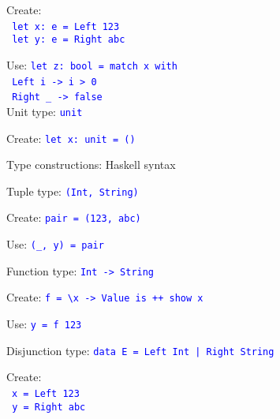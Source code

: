 Create:\\
 \texttt{\textcolor{blue}{\footnotesize{}\ let x:\ e = Left 123}}~\\
\texttt{\textcolor{blue}{\footnotesize{} let y:\ e = Right \textquotedbl abc\textquotedbl}}{\footnotesize\par}

Use: \texttt{\textcolor{blue}{\footnotesize{}let z:\ bool = match
x with}}~\\
\texttt{\textcolor{blue}{\footnotesize{} Left i -> i > 0}}~\\
\texttt{\textcolor{blue}{\footnotesize{} Right \_ -> false}}~\\

Unit type: \texttt{\textcolor{blue}{\footnotesize{}unit}}{\footnotesize\par}

Create: \texttt{\textcolor{blue}{\footnotesize{}let x:\ unit = ()}}{\footnotesize\par}

Type constructions: Haskell syntax

Tuple type: \texttt{\textcolor{blue}{\footnotesize{}(Int, String)}}{\footnotesize\par}

Create: \texttt{\textcolor{blue}{\footnotesize{}pair = (123, \textquotedbl abc\textquotedbl )}} 

Use: \texttt{\textcolor{blue}{\footnotesize{}(\_, y) = pair}}{\footnotesize\par}

Function type: \texttt{\textcolor{blue}{\footnotesize{}Int -> String}}{\footnotesize\par}

Create: \texttt{\textcolor{blue}{\footnotesize{}f = \textbackslash x
-> \textquotedbl Value is \textquotedbl{} ++ show x}} 

Use: \texttt{\textcolor{blue}{\footnotesize{}y = f 123}}{\footnotesize\par}

Disjunction type: \texttt{\textcolor{blue}{\footnotesize{}data E =
Left Int | Right String}}{\footnotesize\par}

Create:\\
\  \texttt{\textcolor{blue}{\footnotesize{}x = Left 123}}~\\
\texttt{\textcolor{blue}{\footnotesize{} y = Right \textquotedbl abc\textquotedbl}}{\footnotesize\par}


